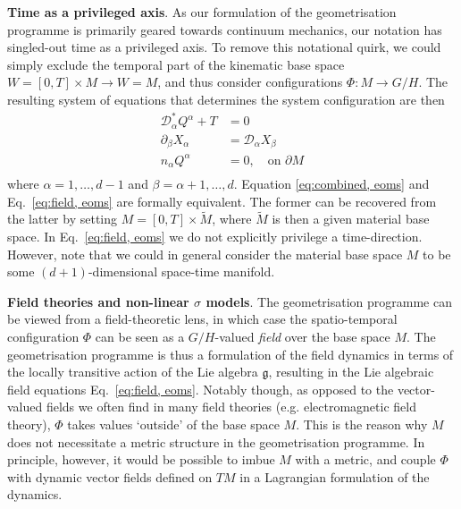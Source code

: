 \textbf{Time as a privileged axis}. As our formulation of the geometrisation programme is primarily geared towards continuum mechanics, our notation has singled-out time as a privileged axis. To remove this notational quirk, we could simply exclude the temporal part of the kinematic base space $W = [0, T] \times M \to W = M$, and thus consider configurations $\Phi : M \to G/H$. The resulting system of equations that determines the system configuration are then
\begin{subequations} \label{eq:field, eoms}
\begin{align}
\mathcal{D}^*_\alpha Q^\alpha + T & = 0 \\
\partial_\beta X_\alpha & = \mathcal{D}_\alpha X_\beta \label{eq:field, spatial integrability} \\
n_\alpha Q^\alpha & = 0, \quad \text{on } \partial M \label{eq:field, boundary conditions} \\
\end{align} 
\end{subequations}
where $\alpha = 1, \dots, d-1$ and $\beta = \alpha+1, \dots, d$. Equation \ref{eq:combined, eoms} and Eq.~\ref{eq:field, eoms} are formally equivalent. The former can be recovered from the latter by setting $M = [0, T] \times \tilde{M}$, where $\tilde{M}$ is then a given material base space. In Eq.~\ref{eq:field, eoms} we do not explicitly privilege a time-direction. However, note that we could in general consider the material base space $M$ to be some $(d+1)$-dimensional space-time manifold.

\textbf{Field theories and non-linear $\sigma$ models}. The geometrisation programme can be viewed from a field-theoretic lens, in which case the spatio-temporal configuration $\Phi$ can be seen as a $G/H$-valued \textit{field} over the base space $M$. The geometrisation programme is thus a formulation of the field dynamics in terms of the locally transitive action of the Lie algebra $\mathfrak{g}$, resulting in the Lie algebraic field equations Eq.~\ref{eq:field, eoms}. Notably though, as opposed to the vector-valued fields we often find in many field theories (e.g. electromagnetic field theory), $\Phi$ takes values `outside' of the base space $M$. This is the reason why $M$ does not necessitate a metric structure in the geometrisation programme. In principle, however, it would be possible to imbue $M$ with a metric, and couple $\Phi$ with dynamic vector fields defined on $TM$ in a Lagrangian formulation of the dynamics.

